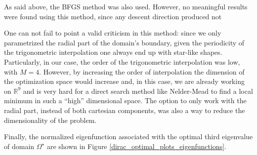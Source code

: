 \begin{figure}[!htb]
\begin{minipage}{.5\textwidth}
        \captionsetup{width=0.8\linewidth} %
        \label{dirac_val_third}
    \end{minipage}
\end{figure}

As said above, the \ac{BFGS} method was also used. However, no meaningful results were found using this method, since any descent direction produced not  

\begin{remark}
    One can not fail to point a valid criticism in this method: since we only parametrized the radial part of the domain's boundary, given the periodicity of the trigonometric interpolation one always end up with star-like shapes. Particularly, in our case, the order of the trigonometric interpolation was low, with \(M=4\). However, by increasing the order of interpolation the dimension of the optimization space would increase and, in this case, we are already working on \(\mathbb{R}^9\) and is very hard for a direct search method like Nelder-Mead to find a local minimum in such a ``high'' dimensional space. The option to only work with the radial part, instead of both cartesian components, was also a way to reduce the dimensionality of the problem. 
\end{remark}

Finally, the normalized eigenfunction associated with the optimal third eigenvalue of domain \(\Omega^\star\) are shown in Figure \ref{dirac_optimal_plots_eigenfunctions}.

